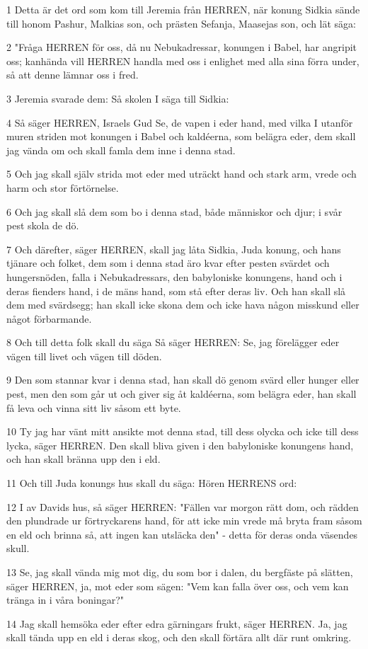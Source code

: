 \par 1 Detta är det ord som kom till Jeremia från HERREN, när konung Sidkia sände till honom Pashur, Malkias son, och prästen Sefanja, Maasejas son, och lät säga:
\par 2 "Fråga HERREN för oss, då nu Nebukadressar, konungen i Babel, har angripit oss; kanhända vill HERREN handla med oss i enlighet med alla sina förra under, så att denne lämnar oss i fred.
\par 3 Jeremia svarade dem: Så skolen I säga till Sidkia:
\par 4 Så säger HERREN, Israels Gud Se, de vapen i eder hand, med vilka I utanför muren striden mot konungen i Babel och kaldéerna, som belägra eder, dem skall jag vända om och skall famla dem inne i denna stad.
\par 5 Och jag skall själv strida mot eder med uträckt hand och stark arm, vrede och harm och stor förtörnelse.
\par 6 Och jag skall slå dem som bo i denna stad, både människor och djur; i svår pest skola de dö.
\par 7 Och därefter, säger HERREN, skall jag låta Sidkia, Juda konung, och hans tjänare och folket, dem som i denna stad äro kvar efter pesten svärdet och hungersnöden, falla i Nebukadressars, den babyloniske konungens, hand och i deras fienders hand, i de mäns hand, som stå efter deras liv. Och han skall slå dem med svärdsegg; han skall icke skona dem och icke hava någon misskund eller något förbarmande.
\par 8 Och till detta folk skall du säga Så säger HERREN: Se, jag förelägger eder vägen till livet och vägen till döden.
\par 9 Den som stannar kvar i denna stad, han skall dö genom svärd eller hunger eller pest, men den som går ut och giver sig åt kaldéerna, som belägra eder, han skall få leva och vinna sitt liv såsom ett byte.
\par 10 Ty jag har vänt mitt ansikte mot denna stad, till dess olycka och icke till dess lycka, säger HERREN. Den skall bliva given i den babyloniske konungens hand, och han skall bränna upp den i eld.
\par 11 Och till Juda konungs hus skall du säga: Hören HERRENS ord:
\par 12 I av Davids hus, så säger HERREN: "Fällen var morgon rätt dom, och rädden den plundrade ur förtryckarens hand, för att icke min vrede må bryta fram såsom en eld och brinna så, att ingen kan utsläcka den" - detta för deras onda väsendes skull.
\par 13 Se, jag skall vända mig mot dig, du som bor i dalen, du bergfäste på slätten, säger HERREN, ja, mot eder som sägen: "Vem kan falla över oss, och vem kan tränga in i våra boningar?"
\par 14 Jag skall hemsöka eder efter edra gärningars frukt, säger HERREN. Ja, jag skall tända upp en eld i deras skog, och den skall förtära allt där runt omkring.

